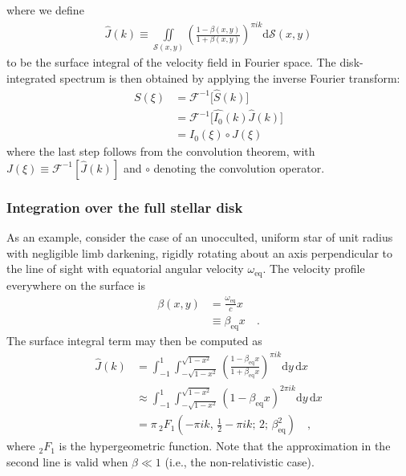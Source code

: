 \documentclass[modern]{aastex62}
\begin{document}
%
where we define
%
\begin{align}
    \hat{J}(k) \equiv 
        \iint\limits_{\mathcal{S}(x, y)}
        \left( \frac{1 - \beta(x, y)}{1 + \beta(x, y)} \right) ^ {\pi i k}
        \mathrm{d}\mathcal{S}(x, y)
\end{align}
%
to be the surface integral of the velocity field in Fourier space.
The disk-integrated spectrum is then obtained by applying the inverse Fourier
transform:
%
\begin{align}
    S(\xi) &= \mathcal{F}^{-1}\Big[ \hat{S}(k) \Big] \nonumber \\
           &= \mathcal{F}^{-1}\Big[ \hat{I_0}(k) \hat{J}(k) \Big] \\
           &= I_0(\xi) \circ J(\xi)
\end{align}
%
where the last step follows from the convolution theorem, 
with $J(\xi) \equiv \mathcal{F}^{-1}\left[ \hat{J}(k) \right]$ and $\circ$
denoting the convolution operator.

\subsubsection{Integration over the full stellar disk}
\label{sec:full_disk}
%
As an example, consider the case of an unocculted, uniform star of unit
radius with negligible limb darkening, rigidly rotating about an axis 
perpendicular to the line of sight with equatorial angular velocity 
$\omega_\mathrm{eq}$. The velocity profile everywhere on the surface is
%
\begin{align}
    \beta(x, y) &= \frac{\omega_\mathrm{eq}}{c}x \nonumber\\
                &\equiv \beta_\mathrm{eq} x 
                \quad .
\end{align}
%
The surface integral term may then be computed as
%
\begin{align}
    \hat{J}(k) 
    &=
        \int_{-1}^{1}
        \int_{-\sqrt{1 - x^2}}^{\sqrt{1 - x^2}}
        \left( 
            \frac{1 - \beta_\mathrm{eq} x}
                 {1 + \beta_\mathrm{eq} x} 
        \right) ^ {\pi i k}
        \mathrm{d}y
        \,
        \mathrm{d}x
        \nonumber \\[0.75em]
    &\approx
        \int_{-1}^{1}
        \int_{-\sqrt{1 - x^2}}^{\sqrt{1 - x^2}}
        \left( 
            1 - \beta_\mathrm{eq} x 
        \right) ^ {2\pi i k}
        \mathrm{d}y
        \,
        \mathrm{d}x
        \nonumber \\[0.75em]
    &=
        \pi \, _{2}F_{1}
            \left(
                -\pi i k, \, 
                \frac{1}{2} - \pi i k; \,
                2; \,
                \beta_\mathrm{eq}^2
            \right)
    \quad ,
\end{align}
%
where $_{2}F_{1}$ is the hypergeometric function. Note that
the approximation in the second line is valid when $\beta \ll 1$
(i.e., the non-relativistic case).
\end{document}

